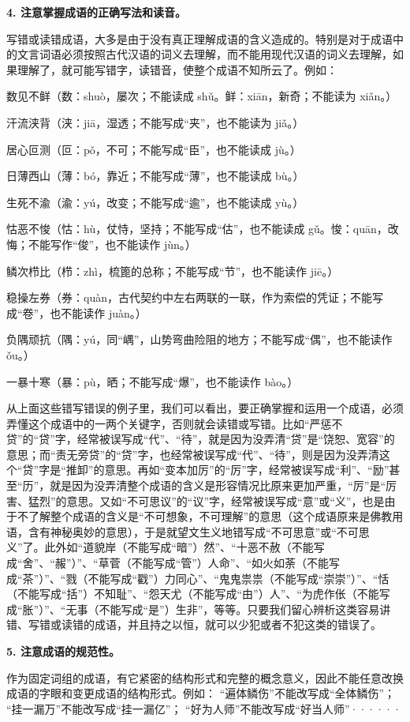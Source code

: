 \textbf{4. 注意掌握成语的正确写法和读音。}

写错或读错成语，大多是由于没有真正理解成语的含义造成的。特别是对于成语中的文言词语必须按照古代汉语的词义去理解，而不能用现代汉语的词义去理解，如果理解了，就可能写错字，读错音，使整个成语不知所云了。例如：

数见不鲜（数：shuò，屡次；不能读成 shǔ。鲜：xiān，新奇；不能读为 xiǎn。）

汗流浃背（浃：jiā，湿透；不能写成“夹”，也不能读为 jiǎ。）

居心叵测（叵：pǒ，不可；不能写成“臣”，也不能读成 jù。）

日薄西山（薄：bó，靠近；不能写成“薄”，也不能读成 bù。）

生死不渝（渝：yú，改变；不能写成“逾”，也不能读成 yù。）

怙恶不悛（怙：hù，仗恃，坚持；不能写成“估”，也不能读成 gǔ。悛：quān，改悔；不能写作“俊”，也不能读作 jùn。）

鳞次栉比（栉：zhì，梳篦的总称；不能写成“节”，也不能读作 jiē。）

稳操左券（券：quàn，古代契约中左右两联的一联，作为索偿的凭证；不能写成“卷”，也不能读作 juàn。）

负隅顽抗（隅：yú，同“嵎”，山势弯曲险阻的地方；不能写成“偶”，也不能读作 ǒu。）

一暴十寒（暴：pù，晒；不能写成“爆”，也不能读作 bào。）

从上面这些错写错误的例子里，我们可以看出，要正确掌握和运用一个成语，必须弄懂这个成语中的一两个关键字，否则就会读错或写错。比如“严惩不贷”的“贷”字，经常被误写成“代”、“待”，就是因为没弄清“贷”是“饶恕、宽容”的意思；而“责无旁贷”的“贷”字，也经常被误写成“代”、“待”，则是因为没弄清这个“贷”字是“推卸”的意思。再如“变本加厉”的“厉”字，经常被误写成“利”、“励”甚至“历”，就是因为没弄清整个成语的含义是形容情况比原来更加严重，“厉”是“厉害、猛烈”的意思。又如“不可思议”的“议”字，经常被误写成“意”或“义”，也是由于不了解整个成语的含义是“不可想象，不可理解”的意思（这个成语原来是佛教用语，含有神秘奥妙的意思），于是就望文生义地错写成“不可思意”或“不可思义”了。此外如“道貌岸（不能写成“暗”）然”、“十恶不赦（不能写成“舍”、“赧”）”、“草菅（不能写成“管”）人命”、“如火如荼（不能写成“茶”）”、“戮（不能写成“戳”）力同心”、“鬼鬼祟祟（不能写成“崇崇”）”、“恬（不能写成“括”）不知耻”、“怨天尤（不能写成“由”）人”、“为虎作伥（不能写成“胀”）”、“无事（不能写成“是”）生非”，等等。只要我们留心辨析这类容易讲错、写错或读错的成语，并且持之以恒，就可以少犯或者不犯这类的错误了。

\textbf{5. 注意成语的规范性。}

作为固定词组的成语，有它紧密的结构形式和完整的概念意义，因此不能任意改换成语的字眼和变更成语的结构形式。例如：
“遍体鳞伤”不能改写成“全体鳞伤”；
“挂一漏万”不能改写成“挂一漏亿”；
“好为人师”不能改写成“好当人师”······

